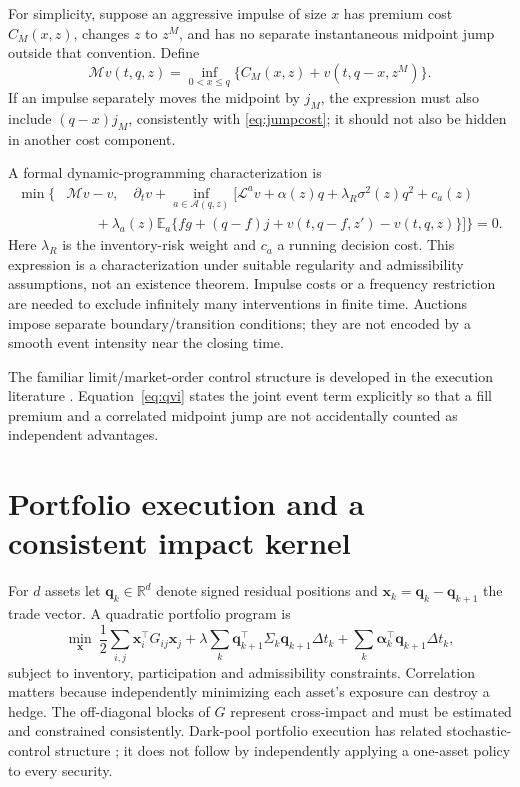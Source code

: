 \documentclass[11pt]{article}
\numberwithin{equation}{section}
\theoremstyle{definition}
\theoremstyle{remark}
\newcommand{\R}{\mathbb{R}}
\newcommand{\E}{\mathbb{E}}
\theoremstyle{definition}
\newcommand{\A}{\mathcal A}
\begin{document}
For simplicity, suppose an aggressive impulse of size $x$ has premium cost
$C_M(x,z)$, changes $z$ to $z^M$, and has no separate instantaneous midpoint
jump outside that convention. Define
\begin{equation}
 \mathcal Mv(t,q,z)=\inf_{0<x\leq q}
               \{C_M(x,z)+v(t,q-x,z^M)\}.
\end{equation}
If an impulse separately moves the midpoint by $j_M$, the expression must
also include $(q-x)j_M$, consistently with \eqref{eq:jumpcost}; it should not
also be hidden in another cost component.

A formal dynamic-programming characterization is
\begin{align}\label{eq:qvi}
 \min\Bigg\{&\mathcal Mv-v,\quad
 \partial_tv+\inf_{a\in\A(q,z)}\Big[\mathcal L^av+
              \alpha(z)q+\lambda_R\sigma^2(z)q^2+c_a(z)\\
 &\qquad+\lambda_a(z)\E_a\{
       fg+(q-f)j+v(t,q-f,z')-v(t,q,z)\}\Big]\Bigg\}=0.\nonumber
\end{align}
Here $\lambda_R$ is the inventory-risk weight and $c_a$ a running decision
cost. This expression is a characterization under suitable regularity and
admissibility assumptions, not an existence theorem. Impulse costs or a
frequency restriction are needed to exclude infinitely many interventions
in finite time. Auctions impose separate boundary/transition conditions;
they are not encoded by a smooth event intensity near the closing time.

The familiar limit/market-order control structure is developed in the
execution literature \citep{cartea2015}. Equation~\eqref{eq:qvi} states the
joint event term explicitly so that a fill premium and a correlated midpoint
jump are not accidentally counted as independent advantages.

\section{Portfolio execution and a consistent impact kernel}\label{app:portfolio}

For $d$ assets let $\bm q_k\in\R^d$ denote signed residual positions and
$\bm x_k=\bm q_k-\bm q_{k+1}$ the trade vector. A quadratic portfolio
program is
\begin{equation}\label{eq:portfolio}
 \min_{\bm x}\ \frac12\sum_{i,j}\bm x_i^\top G_{ij}\bm x_j
   +\lambda\sum_k\bm q_{k+1}^\top\Sigma_k\bm q_{k+1}\Delta t_k
   +\sum_k\bm\alpha_k^\top\bm q_{k+1}\Delta t_k,
\end{equation}
subject to inventory, participation and admissibility constraints. Correlation
matters because independently minimizing each asset's exposure can destroy a
hedge. The off-diagonal blocks of $G$ represent cross-impact and must be
estimated and constrained consistently. Dark-pool portfolio execution has
related stochastic-control structure \citep{kratz2015}; it does not follow
by independently applying a one-asset policy to every security.
\end{document}
